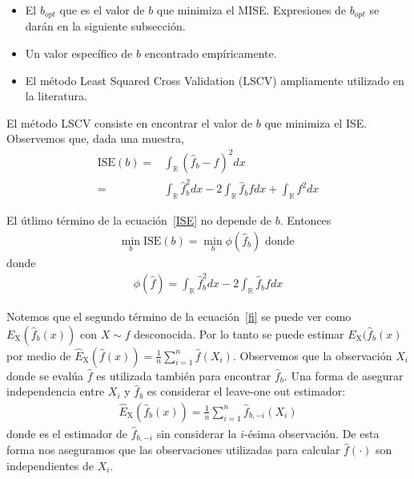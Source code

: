 \begin{itemize}
	\item El $b_{opt}$ que es el valor de $b$ que minimiza el MISE. Expresiones de $b_{opt}$ se darán en la siguiente subsección.
	\item Un valor específico de $b$ encontrado empíricamente.
	\item El método Least Squared Cross Validation (LSCV) ampliamente utilizado en la literatura.
\end{itemize}


El método LSCV consiste en encontrar el valor de $b$ que minimiza el ISE. Observemos que, dada una muestra,
\begin{align}
\label{ISE}
	\text{ISE}(b)=&\int_\mathbb{R} (\widehat{f}_b-f)^2 dx \nonumber\\ 
	=& \int_\mathbb{R} \widehat{f}_b^2dx- 2 \int_\mathbb{R} \widehat{f}_b fdx +\int_\mathbb{R} f^2dx
\end{align}

El útlimo término de la ecuación~\eqref{ISE} no depende de $b$. Entonces
\begin{align}
	\nonumber \min_b \text{ISE}(b)= \min_b \phi(\widehat{f}_b) \text{ donde } 
\end{align}
donde
\begin{align}
\label{fi}
\phi(\widehat{f})=\int_\mathbb{R} \widehat{f}_b^2 dx- 2 \int_\mathbb{R} \widehat{f}_b fdx
\end{align}

Notemos que el segundo término de la ecuación~\eqref{fi} se puede ver como $E_\text{X}(\widehat{f}_b(x))$ con $X \sim f$ desconocida. Por lo tanto se puede estimar $E_\text{X}(\widehat{f}_b(x)$ por medio de $\hat{E}_\text{X}(\widehat{f}(x))=\frac{1}{n}\sum_{i=1}^n \widehat{f}(X_i)$. Observemos que la observación $X_i$ donde se evalúa $\widehat{f}$ es utilizada también para encontrar $\widehat{f}_b$. Una forma de asegurar independencia entre $X_i$ y  $\widehat{f}_b$ es considerar el leave-one out estimador:
\begin{align}
\hat{E}_\text{X}(\widehat{f}_b(x))=\frac{1}{n}\sum_{i=1}^n \widehat{f}_{b,-i}(X_i)
\end{align}	
donde  es el estimador de $\widehat{f}_{b,-i}$ sin considerar la $i$-ésima observación. De esta forma nos aseguramos que las observaciones utilizadas para calcular  $\widehat{f}(\cdot)$ son independientes de $X_i.$

